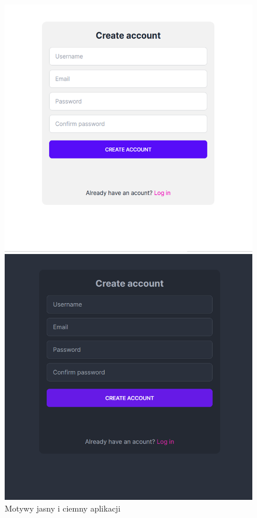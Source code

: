 
\begin{figure}[h!]
  \centering
  \begin{minipage}[b]{0.45\textwidth}
    \centering
    \includegraphics[width=\textwidth]{img/widoki/light.png}
  \end{minipage}%
  \hspace*{0.5cm}
  \begin{minipage}[b]{0.45\textwidth}
    \centering
    \includegraphics[width=\textwidth]{img/widoki/dark.png}
  \end{minipage}
  \caption{Motywy jasny i ciemny aplikacji}
  \label{fig:themes_ui}
\end{figure}

